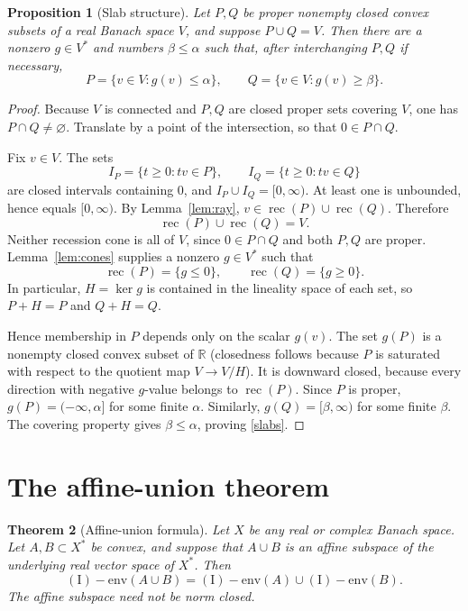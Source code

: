 \documentclass[11pt]{article}
\newtheorem{theorem}{Theorem}[section]
\newtheorem{proposition}[theorem]{Proposition}
\theoremstyle{remark}
\newcommand{\Ienv}{\operatorname{(I)\!\!-env}}
\newcommand{\rec}{\operatorname{rec}}
\newcommand{\R}{\mathbb{R}}
\begin{document}
\begin{proposition}[Slab structure]
\label{prop:slab}
Let $P,Q$ be proper nonempty closed convex subsets of a real Banach space
$V$, and suppose $P\cup Q=V$.  Then there are a nonzero $g\in V^*$ and
numbers $\beta\leq\alpha$ such that, after interchanging $P,Q$ if necessary,
\[
\tag{5.2}\label{slabs}
 P=\{v\in V:g(v)\leq\alpha\},
 \qquad
 Q=\{v\in V:g(v)\geq\beta\}.
\]
\end{proposition}

\begin{proof}
Because $V$ is connected and $P,Q$ are closed proper sets covering $V$, one
has $P\cap Q\neq\varnothing$.  Translate by a point of the intersection, so
that $0\in P\cap Q$.

Fix $v\in V$.  The sets
\[
 I_P=\{t\geq0:tv\in P\},\qquad
 I_Q=\{t\geq0:tv\in Q\}
\]
are closed intervals containing $0$, and $I_P\cup I_Q=[0,\infty)$.  At
least one is unbounded, hence equals $[0,\infty)$.  By
Lemma~\ref{lem:ray}, $v\in\rec(P)\cup\rec(Q)$.  Therefore
\[
 \rec(P)\cup\rec(Q)=V.
\]
Neither recession cone is all of $V$, since $0\in P\cap Q$ and both $P,Q$
are proper.  Lemma~\ref{lem:cones} supplies a nonzero $g\in V^*$ such that
\[
 \rec(P)=\{g\leq0\},\qquad \rec(Q)=\{g\geq0\}.
\]
In particular, $H=\ker g$ is contained in the lineality space of each set,
so $P+H=P$ and $Q+H=Q$.

Hence membership in $P$ depends only on the scalar $g(v)$.  The set $g(P)$
is a nonempty closed convex subset of $\R$ (closedness follows because $P$
is saturated with respect to the quotient map $V\to V/H$).  It is downward
closed, because every direction with negative $g$-value belongs to
$\rec(P)$.  Since $P$ is proper, $g(P)=(-\infty,\alpha]$ for some finite
$\alpha$.  Similarly, $g(Q)=[\beta,\infty)$ for some finite $\beta$.
The covering property gives $\beta\leq\alpha$, proving \eqref{slabs}.
\end{proof}

\section{The affine-union theorem}

\begin{theorem}[Affine-union formula]
\label{thm:affine}
Let $X$ be any real or complex Banach space.  Let $A,B\subset X^*$ be
convex, and suppose that $A\cup B$ is an affine subspace of the underlying
real vector space of $X^*$.  Then
\[
 \Ienv(A\cup B)=\Ienv(A)\cup\Ienv(B).
\]
The affine subspace need not be norm closed.
\end{theorem}
\end{document}
